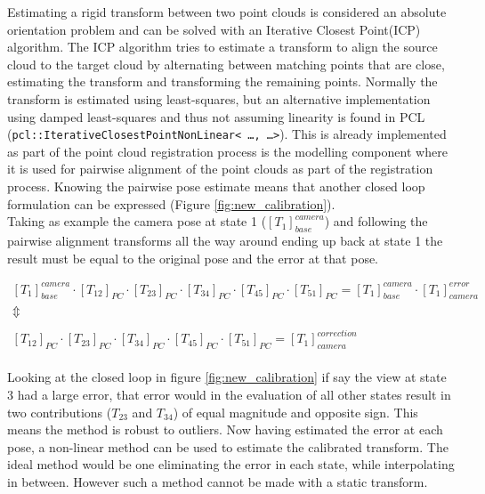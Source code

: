 \noindent Estimating a rigid transform between two point clouds is considered an absolute orientation problem \cite{Horn1987} and can be solved with an Iterative Closest Point(ICP) algorithm. The ICP algorithm tries to estimate a transform to align the source cloud to the target cloud by alternating between matching points that are close, estimating the transform and transforming the remaining points. Normally the transform is estimated using least-squares, but an alternative implementation using damped least-squares\cite{Gavin2011} and thus not assuming linearity is found in PCL (\texttt{pcl::IterativeClosestPointNonLinear< \ldots , \ldots >}). This is already implemented as part of the point cloud registration process is the modelling component where it is used for pairwise alignment of the point clouds as part of the registration process. Knowing the pairwise pose estimate means that another closed loop formulation can be expressed (Figure \ref{fig:new_calibration}). \\

\noindent Taking as example the camera pose at state 1 ($ [T_1]_{base}^{camera} $) and following the pairwise alignment transforms all the way around ending up back at state 1 the result must be equal to the original pose and the error at that pose.

\begin{equation}
\begin{matrix}
[T_{1}]_{base}^{camera} \cdot [T_{12}]_{PC} \cdot [T_{23}]_{PC} \cdot [T_{34}]_{PC} \cdot [T_{45}]_{PC} \cdot [T_{51}]_{PC} = [T_{1}]_{base}^{camera} \cdot [T_{1}]_{camera}^{error}
\\ 
\Updownarrow \\ 
\\ 
[T_{12}]_{PC} \cdot [T_{23}]_{PC} \cdot [T_{34}]_{PC} \cdot [T_{45}]_{PC} \cdot [T_{51}]_{PC} = [T_{1}]_{camera}^{correction}
\end{matrix}
\end{equation}\\ 

\noindent Looking at the closed loop in figure \ref{fig:new_calibration} if say the view at state 3 had a large error, that error would in the evaluation of all other states result in two contributions ($ T_{23} $ and $ T_{34} $) of equal magnitude and opposite sign. This means the method is robust to outliers. Now having estimated the error at each pose, a non-linear method can be used to estimate the calibrated transform. The ideal method would be one eliminating the error in each state, while interpolating in between. However such a method cannot be made with a static transform.\\

